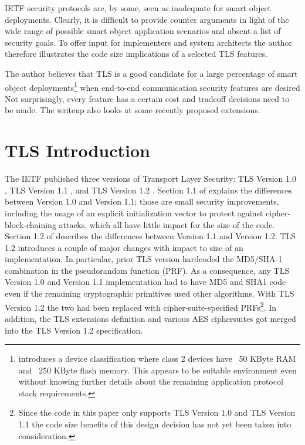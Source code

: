 \documentclass[a4paper, 10pt]{IEEEtran}
\begin{document}
IETF security protocols are, by some, seen as inadequate for smart object deployments. Clearly, it is difficult to provide counter arguments in light of the wide range of possible smart object application scenarios and absent a list of security goals. To offer input for implementers and system architects the author therefore illustrates the code size implications of a selected TLS features. 

The author believes that TLS is a good candidate for a large percentage of smart object deployments\footnote{\cite{I-D.bormann-lwig-guidance} introduces a device classification where class 2 devices have ~50 KByte RAM and ~250 KByte flash memory. This appears to be suitable environment even without knowing further details about the remaining application protocol stack requirements.} when end-to-end communication security features are desired Not surprisingly, every feature has a certain cost and tradeoff decisions need to be made. The writeup also looks at some recently proposed extensions. 



\section{TLS Introduction}

The IETF published three versions of Transport Layer Security: TLS Version 1.0 \cite{rfc2246}, TLS Version 1.1 \cite{rfc4346}, and TLS Version 1.2 \cite{rfc5246}. Section 1.1 of  \cite{rfc4346} explains the differences between Version 1.0 and Version 1.1; those are small security improvements, including the usage of an explicit initialization vector to protect against cipher-block-chaining attacks, which all have little impact for the size of the code. Section 1.2 of \cite{rfc5246} describes the differences between Version 1.1 and Version 1.2. TLS 1.2 introduces a couple of major changes with impact to size of an implementation. In particular, prior TLS version hardcoded the MD5/SHA-1 combination in the pseudorandom function (PRF). As a consequence, any TLS Version 1.0 and Version 1.1 implementation had to have MD5 and SHA1 code even if the remaining cryptographic primitives used other algorithms. With TLS Version 1.2 the two had been replaced with cipher-suite-specified PRFs\footnote{Since the code in this paper only supports TLS Version 1.0 and TLS Version 1.1 the code size benefits of this design decision has not yet been taken into consideration.}. In addition, the TLS extensions definition \cite{rfc6066} and various AES ciphersuites \cite{rfc3268} got merged into the TLS Version 1.2 specification.
\end{document}

